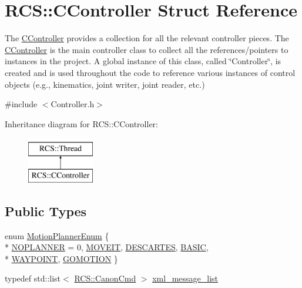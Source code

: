 \hypertarget{structRCS_1_1CController}{\section{R\-C\-S\-:\-:C\-Controller Struct Reference}
\label{structRCS_1_1CController}
}


The \hyperlink{structRCS_1_1CController}{C\-Controller} provides a collection for all the relevant controller pieces. The \hyperlink{structRCS_1_1CController}{C\-Controller} is the main controller class to collect all the references/pointers to instances in the project. A global instance of this class, called \char`\"{}\-Controller\char`\"{}, is created and is used throughout the code to reference various instances of control objects (e.\-g., kinematics, joint writer, joint reader, etc.)  




{\ttfamily \#include $<$Controller.\-h$>$}

Inheritance diagram for R\-C\-S\-:\-:C\-Controller\-:\begin{figure}[H]
\begin{center}
\leavevmode
\includegraphics[height=2.000000cm]{structRCS_1_1CController}
\end{center}
\end{figure}
\subsection*{Public Types}
\begin{DoxyCompactItemize}
\item 
enum \hyperlink{structRCS_1_1CController_a50ede7cd9f47204828f0f7c740dc09b1}{Motion\-Planner\-Enum} \{ \\*
\hyperlink{structRCS_1_1CController_a50ede7cd9f47204828f0f7c740dc09b1ab00d7459e4ea68d1b1496592767bfc2f}{N\-O\-P\-L\-A\-N\-N\-E\-R} = 0, 
\hyperlink{structRCS_1_1CController_a50ede7cd9f47204828f0f7c740dc09b1a7904abb74c1bc4246b43b356be0704b5}{M\-O\-V\-E\-I\-T}, 
\hyperlink{structRCS_1_1CController_a50ede7cd9f47204828f0f7c740dc09b1a1506ec08ab80c752e9613c0d42e8accb}{D\-E\-S\-C\-A\-R\-T\-E\-S}, 
\hyperlink{structRCS_1_1CController_a50ede7cd9f47204828f0f7c740dc09b1aa492ff13d221452a2be124f579142e2f}{B\-A\-S\-I\-C}, 
\\*
\hyperlink{structRCS_1_1CController_a50ede7cd9f47204828f0f7c740dc09b1a2a75cf0f1dff3f261dcbf41639f0c2f9}{W\-A\-Y\-P\-O\-I\-N\-T}, 
\hyperlink{structRCS_1_1CController_a50ede7cd9f47204828f0f7c740dc09b1a063b2368ab3f63d194e7b4bc0182410e}{G\-O\-M\-O\-T\-I\-O\-N}
 \}
\item 
typedef std\-::list$<$ \hyperlink{structRCS_1_1CanonCmd}{R\-C\-S\-::\-Canon\-Cmd} $>$ \hyperlink{structRCS_1_1CController_aeaee07d36d39b56ecad1ce2443b5b4c0}{xml\-\_\-message\-\_\-list}
\end{DoxyCompactItemize}
